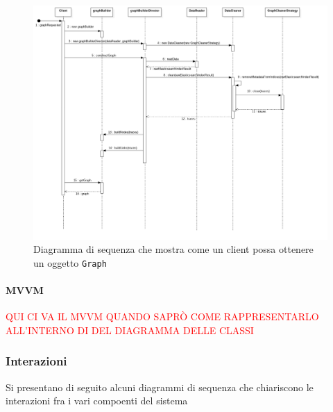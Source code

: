\begin{figure}[H]
	\centering
	\includegraphics[width=1\textwidth]{Images/builderGraphSequence.png}
	\caption{Diagramma di sequenza che mostra come un client possa ottenere un oggetto \texttt{Graph}}
	\label{img:builderGraph}
\end{figure}

\paragraph{MVVM} \Spazio
\textcolor{red}{QUI CI VA IL MVVM QUANDO SAPRÒ COME RAPPRESENTARLO ALL'INTERNO DI DEL DIAGRAMMA DELLE CLASSI}

\subsubsection{Interazioni}
Si presentano di seguito alcuni diagrammi di sequenza che chiariscono le interazioni fra i vari compoenti del sistema

